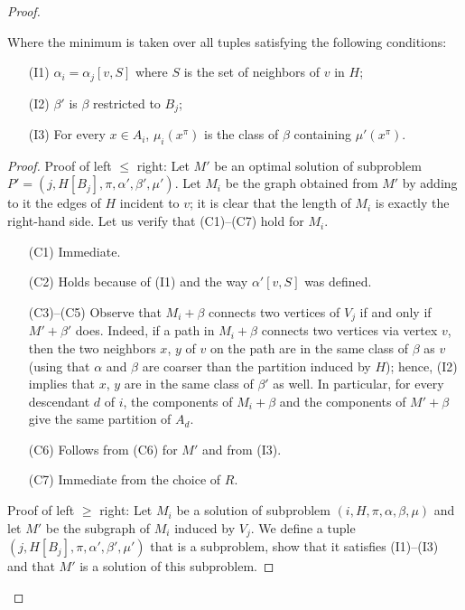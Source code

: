 \begin{proof}
\begin{claim}
Where the minimum is taken over all tuples satisfying the following conditions:

\begin{itemize}
    \item[(I1)] \(\alpha_i = \alpha_j[v, S]\) where \(S\) is the set of neighbors of \(v\) in \(H\);
    \item[(I2)] \(\beta'\) is \(\beta\) restricted to \(B_j\);
    \item[(I3)] For every \(x \in A_i\), \(\mu_i(x^\pi)\) is the class of \(\beta\) containing \(\mu'(x^\pi)\).
\end{itemize}

\end{claim}

\begin{proof}
Proof of left \(\leq\) right:
Let \(M'\) be an optimal solution of subproblem \(P' = (j , H[B_j], \pi, \alpha', \beta', \mu')\). Let \(M_i\) be the graph obtained from \(M'\) by adding to it the edges of \(H\) incident to \(v\); it is clear that the length of \(M_i\) is exactly the right-hand side. Let us verify that (C1)–(C7) hold for \(M_i\).

\begin{itemize}
    \item[(C1)] Immediate.
    \item[(C2)] Holds because of (I1) and the way \(\alpha'[v, S]\) was defined.
    \item[(C3)–(C5)] Observe that \(M_i + \beta\) connects two vertices of \(V_j\) if and only if \(M' + \beta'\) does. Indeed, if a path in \(M_i + \beta\) connects two vertices via vertex \(v\), then the two neighbors \(x\), \(y\) of \(v\) on the path are in the same class of \(\beta\) as \(v\) (using that \(\alpha\) and \(\beta\) are coarser than the partition induced by \(H\)); hence, (I2) implies that \(x\), \(y\) are in the same class of \(\beta'\) as well. In particular, for every descendant \(d\) of \(i\), the components of \(M_i + \beta\) and the components of \(M' + \beta\) give the same partition of \(A_d\).
    \item[(C6)] Follows from (C6) for \(M'\) and from (I3).
    \item[(C7)] Immediate from the choice of \(R\).
\end{itemize}

Proof of left \(\geq\) right:
Let \(M_i\) be a solution of subproblem \((i, H, \pi, \alpha, \beta, \mu)\) and let \(M'\) be the subgraph of \(M_i\) induced by \(V_j\). We define a tuple \((j, H[B_j], \pi, \alpha', \beta', \mu')\) that is a subproblem, show that it satisfies (I1)–(I3) and that \(M'\) is a solution of this subproblem.


\end{proof}
\end{proof}
